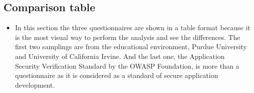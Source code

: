 \documentclass[paper=letter, fontsize=12pt]{article}
\begin{document}
\begin{landscape}
\section{Comparison table}

\begin{itemize}

 \item In this section the three questionnaires are shown in a table format because it is the most visual way to perform the analysis and see the differences. The first two samplings are from the educational environment, Purdue University and University of California Irvine. And the last one, the Application Security Verification Standard by the OWASP Foundation, is more than a questionnaire as it is considered as a standard of secure application development.   
 

\end{itemize}
\end{landscape}
\end{document}
